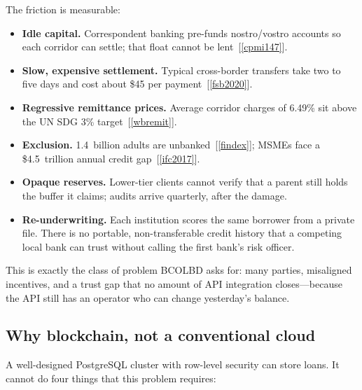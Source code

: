 \documentclass[11pt,a4paper]{article}
\newcommand{\rcite}[1]{[\ref{#1}]}
\begin{document}
The friction is measurable:
\begin{itemize}
  \item \textbf{Idle capital.} Correspondent banking pre-funds nostro/vostro accounts so each corridor can settle; that float cannot be lent~\rcite{cpmi147}.
  \item \textbf{Slow, expensive settlement.} Typical cross-border transfers take two to five days and cost about \$45 per payment~\rcite{fsb2020}.
  \item \textbf{Regressive remittance prices.} Average corridor charges of 6.49\% sit above the UN SDG 3\% target~\rcite{wbremit}.
  \item \textbf{Exclusion.} 1.4~billion adults are unbanked~\rcite{findex}; MSMEs face a \$4.5~trillion annual credit gap~\rcite{ifc2017}.
  \item \textbf{Opaque reserves.} Lower-tier clients cannot verify that a parent still holds the buffer it claims; audits arrive quarterly, after the damage.
  \item \textbf{Re-underwriting.} Each institution scores the same borrower from a private file. There is no portable, non-transferable credit history that a competing local bank can trust without calling the first bank's risk officer.
\end{itemize}

This is exactly the class of problem BCOLBD asks for: many parties, misaligned incentives, and a trust gap that no amount of API integration closes---because the API still has an operator who can change yesterday's balance.

\subsection{Why blockchain, not a conventional cloud}

A well-designed PostgreSQL cluster with row-level security can store loans. It cannot do four things that this problem requires:
\end{document}
